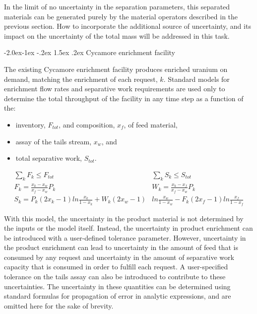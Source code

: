 \documentclass[dvips,11pt]{article}
\makeatletter
\renewcommand\subsubsection{\@startsection{subsubsection}{3}{\z@}%
                                     {-2.0ex\@plus -1ex \@minus -.2ex}%
                                     {1.5ex \@plus .2ex}%
                                     {\normalfont\bfseries}}%
\makeatother
\begin{document}
In the limit of no uncertainty in the separation
parameters, this separated materials can be
generated purely by the material operators
described in the previous section.  How to
incorporate the additional source of uncertainty,
and its impact on the uncertainty of the total
mass will be addressed in this task.

\subsubsection{Cycamore enrichment facility}

The existing Cycamore enrichment facility produces
enriched uranium on demand, matching the
enrichment of each request, $k$.  Standard models
for enrichment flow rates and separative work
requirements are used only to determine the total
throughput of the facility in any time step as a
function of the:
\begin{itemize}[nosep]
\item inventory, $F_{tot}$, and composition,
  $x_f$, of feed material,
\item assay of the tails stream, $x_w$, and
\item total separative work, $S_{tot}$.
\end{itemize}
\begin{align*}
  \sum_k{F_k} \leq F_{tot}\qquad\qquad
  &\sum_k{S_k} \leq S_{tot}\\
  F_k = \frac{x_k - x_w}{x_f - x_w} P_k\qquad\qquad\qquad
  &W_k = \frac{x_k - x_f}{x_f - x_w} P_k\\
  S_k =  P_k\left(2x_k-1\right)ln\frac{x_k}{1-x_k}
         +W_k\left(2x_w-1\right)&ln\frac{x_w}{1-x_w}  
         -F_k\left(2x_f-1\right)ln\frac{x_f}{1-x_f}
\end{align*}

With this model, the uncertainty in the product
material is not determined by the inputs or the
model itself.  Instead, the uncertainty in product
enrichment can be introduced with a user-defined
tolerance parameter.  However, uncertainty in
the product enrichment can lead to uncertainty in
the amount of feed that is consumed by any request
and uncertainty in the amount of separative work
capacity that is consumed in order to fulfill each
request.  A user-specified tolerance on the tails
assay can also be introduced to contribute to
these uncertainties.  The uncertainty in these 
quantities can be determined using standard
formulas for propagation of error in analytic
expressions, and are omitted here for the sake of 
brevity.
\end{document}
